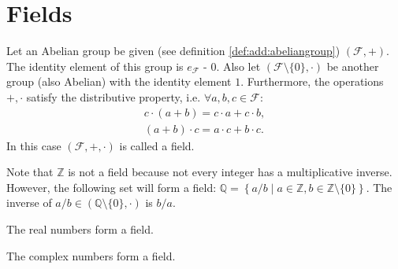 \section{Fields}
\begin{definition}
  Let an Abelian group be given (see definition
  \ref{def:add:abeliangroup})  
  $(\mathcal{F}, +)$. The identity element of this group is $e_\mathcal{F}$ -
  $0$. Also let $(\mathcal{F} \setminus \{0\}, \cdot)$ be another
  group (also Abelian) with the identity element $1$. Furthermore, the operations
  $+,\cdot$ satisfy the distributive property, i.e. $\forall
  a,b,c \in \mathcal{F}$:
  \begin{eqnarray}
  c \cdot \left(a + b\right) = c \cdot a + c \cdot b,
  \nonumber \\
  \left(a + b\right) \cdot c = a \cdot c + b \cdot c.
  \nonumber
  \end{eqnarray}
  In this case $(\mathcal{F}, +, \cdot)$ is called a field.
  \label{def:field}
\end{definition}

\begin{example}
  Note that $\mathbb{Z}$ is not a field because not every integer
  has a multiplicative inverse. 
  However, the following set will form a field: $\mathbb{Q} =
  \left\{a/b \mid a \in \mathbb{Z}, b \in 
  \mathbb{Z}\setminus\{0\}\right\}$. The inverse of
  $a/b \in \left(\mathbb{Q}\setminus\{0\}, \cdot\right)$ is $b/a$.
  \label{ex:field_q}
\end{example}

\begin{example}
  The real numbers form a field.
  \label{ex:field_r}
\end{example}

\begin{example}
  The complex numbers form a field.
  \label{ex:field_c}
\end{example}